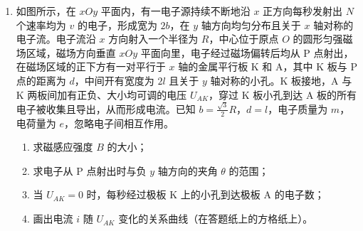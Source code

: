 \documentclass[\gkver]{gaokaozhenti}
\begin{document}
\begin{enumerate}


\item
如图所示，在 $xOy$ 平面内，有一电子源持续不断地沿 $x$ 正方向每秒发射出 $N$ 个速率均为 $v$ 的电子，形成宽为 $2b$，在 $y$ 轴方向均匀分布且关于 $x$ 轴对称的电子流。电子流沿 $x$ 方向射入一个半径为 $R$，中心位于原点 $O$ 的圆形匀强磁场区域，磁场方向垂直 $xOy$ 平面向里，电子经过磁场偏转后均从 P 点射出，在磁场区域的正下方有一对平行于 $x$ 轴的金属平行板 K 和 A，其中 K 板与 P 点的距离为 $d$，中间开有宽度为 $2l$ 且关于 $y$ 轴对称的小孔。K 板接地，A 与 K 两板间加有正负、大小均可调的电压 $U_{AK}$，穿过 K 板小孔到达 A 板的所有电子被收集且导出，从而形成电流。已知 $b=\frac{\sqrt{3}}{2}R$，$d=l$，电子质量为 $m$，电荷量为 $e$，忽略电子间相互作用。

\begin{enumerate}
	\item
	求磁感应强度 $B$ 的大小；
	\item
	求电子从 P 点射出时与负 $y$ 轴方向的夹角 $\theta$ 的范围；
	\item
	当 $U_{AK}=0$ 时，每秒经过极板 K 上的小孔到达极板 A 的电子数；
	\item
	画出电流 $i$ 随 $U_{AK}$ 变化的关系曲线（在答题纸上的方格纸上）。
\end{enumerate}


\end{enumerate}
\end{document}
